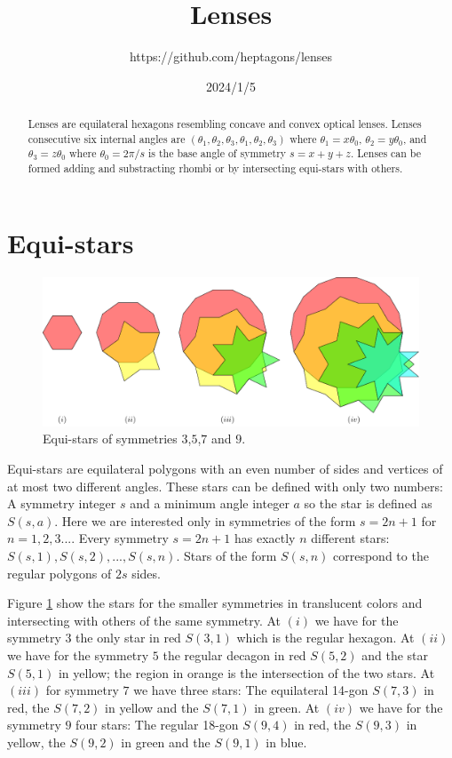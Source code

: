 \documentclass[11pt]{article}
\title{Lenses}
\author{https://github.com/heptagons/lenses}
\date{2024/1/5}
\begin{document}
\maketitle
\begin{abstract}
Lenses are equilateral hexagons resembling concave and convex optical lenses. Lenses consecutive six internal angles are $(\theta_1,\theta_2,\theta_3,\theta_1,\theta_2,\theta_3)$ where $\theta_1 = x\theta_0$, $\theta_2 = y\theta_0$, and $\theta_3 = z\theta_0$ where $\theta_0 = 2\pi/s$ is the base angle of symmetry $s = x + y + z$. Lenses can be formed adding and substracting rhombi or by intersecting equi-stars with others.
\end{abstract}

\section{Equi-stars}

\begin{figure}[H]
\centering
\includegraphics[scale=1]{stars/stars}
\caption{Equi-stars of symmetries $3$,$5$,$7$ and $9$.}
\label{fig:stars}
\end{figure}

Equi-stars are equilateral polygons with an even number of sides and vertices of at most two different angles. These stars can be defined with only two numbers: A symmetry integer $s$ and a minimum angle integer $a$ so the star is defined as $S(s,a)$. Here we are interested only in symmetries of the form $s=2n+1$ for $n=1,2,3...$. Every symmetry $s=2n+1$ has exactly $n$ different stars: $S(s,1),S(s,2),...,S(s,n)$. Stars of the form $S(s,n)$ correspond to the regular polygons of $2s$ sides.

Figure \ref{fig:stars} show the stars for the smaller symmetries in translucent colors and intersecting with others of the same symmetry. At $(i)$ we have for the symmetry $3$ the only star in red $S(3,1)$ which is the regular hexagon. At $(ii)$ we have for the symmetry $5$ the regular decagon in red $S(5,2)$ and the star $S(5,1)$ in yellow; the region in orange is the intersection of the two stars. At $(iii)$ for symmetry $7$ we have three stars: The equilateral 14-gon $S(7,3)$ in red, the $S(7,2)$ in yellow and the $S(7,1)$ in green. At $(iv)$ we have for the symmetry $9$ four stars: The regular 18-gon $S(9,4)$ in red, the $S(9,3)$ in yellow, the $S(9,2)$ in green and the $S(9,1)$ in blue.
\end{document}
